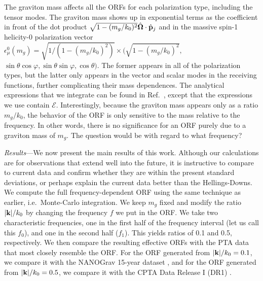 \documentclass[prd,twocolumn,aps,psfig,nofootinbib,nobibnotes,superscriptaddress,preprintnumbers,times]{revtex4-2}
\begin{document}
The graviton mass affects all the ORFs for each polarization type, including the tensor modes. The graviton mass shows up in exponential terms as the coefficient in front of the dot product $\sqrt{1 - (m_g/k_0)^2}\hat{\bf \Omega}\cdot \hat{\bf p}_j$ and in the massive spin-1 helicity-0 polarization vector $\epsilon_\mu^0(m_g) = \sqrt{1 / (1 - (m_g/k_0)^2)}\times (\sqrt{1 - (m_g/k_0)^2},$ $\sin\theta\cos\varphi, \sin\theta\sin\varphi, \cos\theta)$. The former appears in all of the polarization types, but the latter only appears in the vector and scalar modes in the receiving functions, further complicating their mass dependences. The analytical expressions that we integrate can be found in Ref.~\cite{Liang:2021bct}, except that the expressions we use contain $\mathcal{E}$. Interestingly, because the graviton mass appears only as a ratio $m_g / k_0$, the behavior of the ORF is only sensitive to the mass relative to the frequency. In other words, there is no significance for an ORF purely due to a graviton mass of $m_g$. The question would be with regard to what frequency?

\textit{Results}---We now present the main results of this work. Although our calculations are for observations that extend well into the future, it is instructive to compare to current data and confirm whether they are within the present standard deviations, or perhaps explain the current data better than the Hellings-Downs. We compute the full frequency-dependent ORF using the same technique as earlier, i.e.\ Monte-Carlo integration. We keep $m_g$ fixed and modify the ratio $|{\bf k}|/k_0$ by changing the frequency $f$ we put in the ORF. We take two characteristic frequencies, one in the first half of the frequency interval (let us call this $f_0$), and one in the second half ($f_1$). This yields ratios of 0.1 and 0.5, respectively. We then compare the resulting effective ORFs with the PTA data that most closely resemble the ORF. For the ORF generated from $|{\bf k}|/k_0 = 0.1$, we compare it with the NANOGrav 15-year dataset \cite{Agazie:2023, Xu:2023wog}, and for the ORF generated from $|{\bf k}|/k_0 = 0.5$, we compare it with the CPTA Data Release I (DR1) \cite{Xu:2023wog}.
\end{document}
